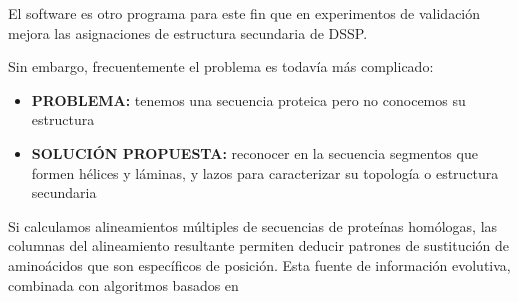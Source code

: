 El software  \citep{Frishman1995} es otro programa para este fin 
que en experimentos de validaci\'{o}n mejora las asignaciones de estructura secundaria de DSSP.

Sin embargo, frecuentemente el problema es todav\'{i}a m\'{a}s complicado:
\begin{itemize}
\item \textbf{PROBLEMA:} tenemos una secuencia proteica pero no conocemos su estructura 
\item \textbf{SOLUCI\'{O}N PROPUESTA:} reconocer en la secuencia segmentos que formen h\'{e}lices y l\'{a}minas, y lazos 
para caracterizar su topolog\'{i}a o estructura secundaria 
\end{itemize} 

Si calculamos alineamientos m\'{u}ltiples de secuencias de prote\'{i}nas hom\'{o}logas,
las columnas del alineamiento resultante permiten deducir patrones de sustituci\'{o}n de amino\'{a}cidos
que son espec\'{i}ficos de posici\'{o}n. Esta fuente de informaci\'{o}n evolutiva,
combinada con algoritmos basados en 
